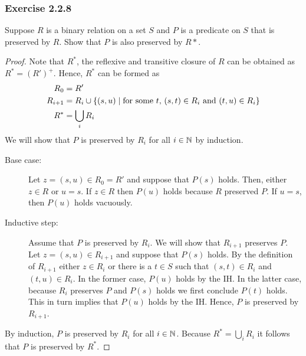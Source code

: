 \subsubsection*{Exercise 2.2.8}
Suppose $R$ is a binary relation on a set $S$ and $P$ is a predicate on $S$ that is preserved by $R$.  Show that $P$ is also preserved by $R*$.
\begin{proof}
Note that $R^*$, the reflexive and transitive closure of $R$ can be obtained as $R^* = (R')^+$.  Hence, $R^*$ can be formed as 
\begin{align*}
    R_0 &= R'    \\
    R_{i+1} &= R_i \cup \{(s, u)\mid\text{for some $t$, $(s, t) \in R_i$ and $(t, u) \in R_i$}\} \\
    R^* &= \bigcup_i R_i
\end{align*}
We will show that $P$ is preserved by $R_i$ for all $i \in \mathbb{N}$ by induction.
\begin{description}
    \item[Base case:] Let $z = (s, u) \in R_0 = R'$ and suppose that $P(s)$ holds.  Then, either $z \in R$ or $u = s$.  If $z \in R$ then $P(u)$ holds because $R$ preserved $P$.
If $u = s$, then $P(u)$ holds vacuously.
\item[Inductive step:] Assume that $P$ is preserved by $R_i$.  We will show that $R_{i+1}$ 
    preserves $P$. Let $z = (s, u) \in R_{i+1}$ and suppose that $P(s)$ holds.  By the definition of 
    $R_{i+1}$ either $z \in R_i$ or there is a $t \in S$ such that $(s, t) \in R_i$ and $(t, u) \in R_i$.
    In the former case, $P(u)$ holds by the IH.  In the latter case, because $R_i$ preserves $P$ and $P(s)$ holds we first conclude $P(t)$ holds. This in turn implies that $P(u)$ holds by the IH.  Hence, $P$ is preserved by $R_{i+1}$.
\end{description}
By induction, $P$ is preserved by $R_i$ for all $i \in \mathbb{N}$.  Because $R^* = \bigcup_i R_i$ it follows that
$P$ is preserved by $R^*$.
\end{proof}


















